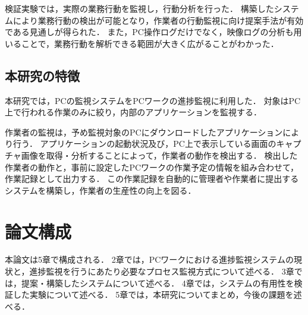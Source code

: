 検証実験では，実際の業務行動を監視し，行動分析を行った．
構築したシステムにより業務行動の検出が可能となり，作業者の行動監視に向け提案手法が有効である見通しが得られた．
また，PC操作ログだけでなく，映像ログの分析も用いることで，業務行動を解析できる範囲が大きく広がることがわかった．

\subsection{本研究の特徴}
本研究では，PCの監視システムをPCワークの進捗監視に利用した．
対象はPC上で行われる作業のみに絞り，内部のアプリケーションを監視する．

作業者の監視は，予め監視対象のPCにダウンロードしたアプリケーションにより行う．
アプリケーションの起動状況及び，PC上で表示している画面のキャプチャ画像を取得・分析することによって，作業者の動作を検出する．
検出した作業者の動作と，事前に設定したPCワークの作業予定の情報を組み合わせて，作業記録として出力する．
この作業記録を自動的に管理者や作業者に提出するシステムを構築し，作業者の生産性の向上を図る．

\section{論文構成}
本論文は5章で構成される．
2章では，PCワークにおける進捗監視システムの現状と，進捗監視を行うにあたり必要なプロセス監視方式について述べる．
3章では，提案・構築したシステムについて述べる．
4章では，システムの有用性を検証した実験について述べる．
5章では，本研究についてまとめ，今後の課題を述べる．
